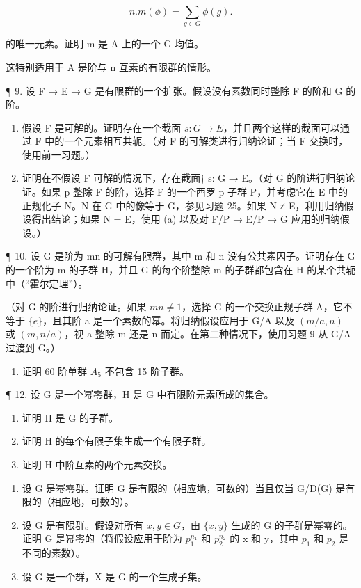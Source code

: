 \[
n. m (\phi) = \sum_ {g \in G} \phi (g).
\]

的唯一元素。证明 m 是 A 上的一个 G-均值。

这特别适用于 A 是阶与 n 互素的有限群的情形。

¶ 9. 设 F → E → G 是有限群的一个扩张。假设没有素数同时整除 F 的阶和 G 的阶。

\begin{enumerate}
\def\labelenumi{(\alph{enumi})}
\item
  假设 F 是可解的。证明存在一个截面 \(s: G \rightarrow E\)，并且两个这样的截面可以通过 F 中的一个元素相互共轭。（对 F 的可解类进行归纳论证；当 F 交换时，使用前一习题。）
\item
  证明在不假设 F 可解的情况下，存在截面† s: G → E。（对 G 的阶进行归纳论证。如果 p 整除 F 的阶，选择 F 的一个西罗 p-子群 P，并考虑它在 E 中的正规化子 N。N 在 G 中的像等于 G，参见习题 25。如果 N ≠ E，利用归纳假设得出结论；如果 N = E，使用 (a) 以及对 F/P → E/P → G 应用的归纳假设。）
\end{enumerate}

¶ 10. 设 G 是阶为 mn 的可解有限群，其中 m 和 n 没有公共素因子。证明存在 G 的一个阶为 m 的子群 H，并且 G 的每个阶整除 m 的子群都包含在 H 的某个共轭中（“霍尔定理”）。

（对 G 的阶进行归纳论证。如果 \(mn \neq 1\)，选择 G 的一个交换正规子群 A，它不等于 \(\{e\}\)，且其阶 a 是一个素数的幂。将归纳假设应用于 G/A 以及 \((m/a, n)\) 或 \((m, n/a)\)，视 a 整除 m 还是 n 而定。在第二种情况下，使用习题 9 从 G/A 过渡到 G。）

\begin{enumerate}
\def\labelenumi{\arabic{enumi}。}
\setcounter{enumi}{10}
\tightlist
\item
  证明 60 阶单群 \(A_{5}\) 不包含 15 阶子群。
\end{enumerate}

¶ 12. 设 G 是一个幂零群，H 是 G 中有限阶元素所成的集合。

\begin{enumerate}
\def\labelenumi{(\alph{enumi})}
\item
  证明 H 是 G 的子群。
\item
  证明 H 的每个有限子集生成一个有限子群。
\item
  证明 H 中阶互素的两个元素交换。
\end{enumerate}

\begin{enumerate}
\def\labelenumi{\arabic{enumi}。}
\setcounter{enumi}{12}
\item
  设 G 是幂零群。证明 G 是有限的（相应地，可数的）当且仅当 G/D(G) 是有限的（相应地，可数的）。
\item
  设 G 是有限群。假设对所有 \(x, y \in G\)，由 \(\{x, y\}\) 生成的 G 的子群是幂零的。证明 G 是幂零的（将假设应用于阶为 \(p_{1}^{n_{1}}\) 和 \(p_{2}^{n_{2}}\) 的 x 和 y，其中 \(p_{1}\) 和 \(p_{2}\) 是不同的素数）。
\item
  设 G 是一个群，X 是 G 的一个生成子集。
\end{enumerate}

